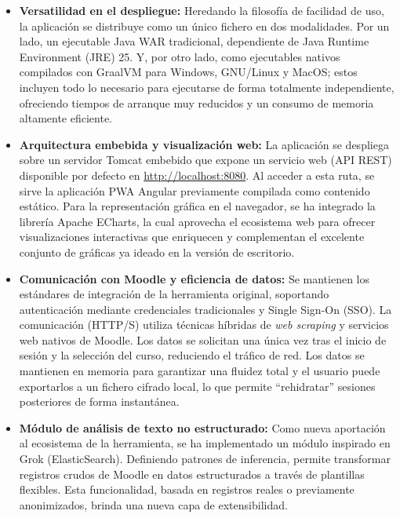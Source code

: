 \begin{itemize}
    \item \textbf{Versatilidad en el despliegue:} Heredando la filosofía de facilidad de uso, la aplicación se distribuye como un único fichero en dos modalidades. Por un lado, un ejecutable Java WAR tradicional, dependiente de Java Runtime Environment (JRE) 25. Y, por otro lado, como ejecutables nativos compilados con GraalVM \cite{graalvm} para Windows, GNU/Linux y MacOS; estos incluyen todo lo necesario para ejecutarse de forma totalmente independiente, ofreciendo tiempos de arranque muy reducidos y un consumo de memoria altamente eficiente.

    \item \textbf{Arquitectura embebida y visualización web:} La aplicación se despliega sobre un servidor Tomcat embebido que expone un servicio web (API REST) disponible por defecto en \url{http://localhost:8080}. Al acceder a esta ruta, se sirve la aplicación PWA Angular previamente compilada como contenido estático. Para la representación gráfica en el navegador, se ha integrado la librería Apache ECharts, la cual aprovecha el ecosistema web para ofrecer visualizaciones interactivas que enriquecen y complementan el excelente conjunto de gráficas ya ideado en la versión de escritorio.

    \item \textbf{Comunicación con Moodle y eficiencia de datos:} Se mantienen los estándares de integración de la herramienta original, soportando autenticación mediante credenciales tradicionales y Single Sign-On (SSO). La comunicación (HTTP/S) utiliza técnicas híbridas de \textit{web scraping} y servicios web nativos de Moodle. Los datos se solicitan una única vez tras el inicio de sesión y la selección del curso, reduciendo el tráfico de red. Los datos se mantienen en memoria para garantizar una fluidez total y el usuario puede exportarlos a un fichero cifrado local, lo que permite ``rehidratar'' sesiones posteriores de forma instantánea.

    \item \textbf{Módulo de análisis de texto no estructurado:} Como nueva aportación al ecosistema de la herramienta, se ha implementado un módulo inspirado en Grok (ElasticSearch). Definiendo patrones de inferencia, permite transformar registros crudos de Moodle en datos estructurados a través de plantillas flexibles. Esta funcionalidad, basada en registros reales o previamente anonimizados, brinda una nueva capa de extensibilidad.
\end{itemize}

